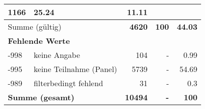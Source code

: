 \begin{longtable}{lXrrr}
       \num{1166} &
       \num[round-mode=places,round-precision=2]{25.24} &
         \num[round-mode=places,round-precision=2]{11.11} \\
     \midrule
     \multicolumn{2}{l}{Summe (gültig)} &
       \textbf{\num{4620}} &
     \textbf{\num{100}} &
       \textbf{\num[round-mode=places,round-precision=2]{44.03}} \\
     \multicolumn{5}{l}{\textbf{Fehlende Werte}}\\
       -998 &
       keine Angabe &
         \num{104} &
        - &
         \num[round-mode=places,round-precision=2]{0.99} \\
       -995 &
       keine Teilnahme (Panel) &
         \num{5739} &
        - &
         \num[round-mode=places,round-precision=2]{54.69} \\
       -989 &
       filterbedingt fehlend &
         \num{31} &
        - &
         \num[round-mode=places,round-precision=2]{0.3} \\
     \midrule
     \multicolumn{2}{l}{\textbf{Summe (gesamt)}} &
          \textbf{\num{10494}} &
        \textbf{-} &
        \textbf{\num{100}} \\
     \bottomrule
     \end{longtable}
     

